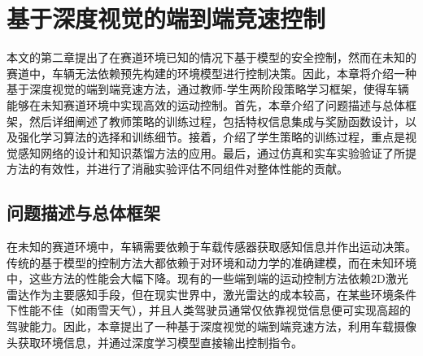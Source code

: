 \chapter{基于深度视觉的端到端竞速控制}
本文的第二章提出了在赛道环境已知的情况下基于模型的安全控制，然而在未知的赛道中，车辆无法依赖预先构建的环境模型进行控制决策。因此，本章将介绍一种基于深度视觉的端到端竞速方法，通过教师-学生两阶段策略学习框架，使得车辆能够在未知赛道环境中实现高效的运动控制。首先，本章介绍了问题描述与总体框架，然后详细阐述了教师策略的训练过程，包括特权信息集成与奖励函数设计，以及强化学习算法的选择和训练细节。接着，介绍了学生策略的训练过程，重点是视觉感知网络的设计和知识蒸馏方法的应用。最后，通过仿真和实车实验验证了所提方法的有效性，并进行了消融实验评估不同组件对整体性能的贡献。
\section{问题描述与总体框架}
在未知的赛道环境中，车辆需要依赖于车载传感器获取感知信息并作出运动决策。传统的基于模型的控制方法大都依赖于对环境和动力学的准确建模，而在未知环境中，这些方法的性能会大幅下降。现有的一些端到端的运动控制方法依赖2D激光雷达作为主要感知手段，但在现实世界中，激光雷达的成本较高，在某些环境条件下性能不佳（如雨雪天气），并且人类驾驶员通常仅依靠视觉信息便可实现高超的驾驶能力。因此，本章提出了一种基于深度视觉的端到端竞速方法，利用车载摄像头获取环境信息，并通过深度学习模型直接输出控制指令。


